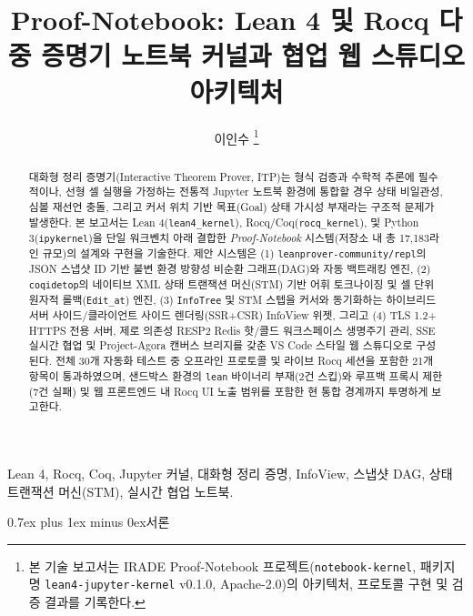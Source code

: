 \documentclass[journal]{IEEEtran}
\makeatletter
\def\section{\@startsection{section}{1}{\z@}{1.5ex plus 1.5ex minus 0.5ex}%
  {0.7ex plus 1ex minus 0ex}{\normalfont\normalsize\centering\bfseries}}%
\newcommand{\code}[1]{\texttt{#1}}
\makeatother
\begin{document}
\title{Proof-Notebook: Lean 4 및 Rocq 다중 증명기 노트북 커널과 협업 웹 스튜디오 아키텍처}

\author{이인수%
\thanks{본 기술 보고서는 IRADE Proof-Notebook 프로젝트(\code{notebook-kernel}, 패키지명 \code{lean4-jupyter-kernel} v0.1.0, Apache-2.0)의 아키텍처, 프로토콜 구현 및 검증 결과를 기록한다.}}


\maketitle

\begin{abstract}
대화형 정리 증명기(Interactive Theorem Prover, ITP)는 형식 검증과 수학적 추론에 필수적이나, 선형 셀 실행을 가정하는 전통적 Jupyter 노트북 환경에 통합할 경우 상태 비일관성, 심볼 재선언 충돌, 그리고 커서 위치 기반 목표(Goal) 상태 가시성 부재라는 구조적 문제가 발생한다. 본 보고서는 Lean 4(\code{lean4\_kernel}), Rocq/Coq(\code{rocq\_kernel}), 및 Python 3(\code{ipykernel})을 단일 워크벤치 아래 결합한 \textit{Proof-Notebook} 시스템(저장소 내 총 17,183라인 규모)의 설계와 구현을 기술한다. 제안 시스템은 (1) \code{leanprover-community/repl}의 JSON 스냅샷 ID 기반 불변 환경 방향성 비순환 그래프(DAG)와 자동 백트래킹 엔진, (2) \code{coqidetop}의 네이티브 XML 상태 트랜잭션 머신(STM) 기반 어휘 토크나이징 및 셀 단위 원자적 롤백(\code{Edit\_at}) 엔진, (3) \code{InfoTree} 및 STM 스텝을 커서와 동기화하는 하이브리드 서버 사이드/클라이언트 사이드 렌더링(SSR+CSR) InfoView 위젯, 그리고 (4) TLS 1.2+ HTTPS 전용 서버, 제로 의존성 RESP2 Redis 핫/콜드 워크스페이스 생명주기 관리, SSE 실시간 협업 및 Project-Agora 캔버스 브리지를 갖춘 VS Code 스타일 웹 스튜디오로 구성된다. 전체 30개 자동화 테스트 중 오프라인 프로토콜 및 라이브 Rocq 세션을 포함한 21개 항목이 통과하였으며, 샌드박스 환경의 \code{lean} 바이너리 부재(2건 스킵)와 루프백 프록시 제한(7건 실패) 및 웹 프론트엔드 내 Rocq UI 노출 범위를 포함한 현 통합 경계까지 투명하게 보고한다.
\end{abstract}

\begin{IEEEkeywords}
Lean 4, Rocq, Coq, Jupyter 커널, 대화형 정리 증명, InfoView, 스냅샷 DAG, 상태 트랜잭션 머신(STM), 실시간 협업 노트북.
\end{IEEEkeywords}

\section{서론}
\end{document}

